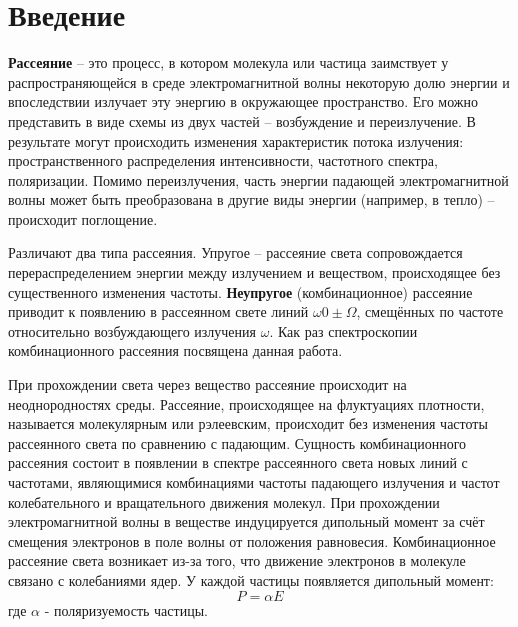 \documentclass{article}
\begin{document}
\section{Введение}\;
\par \textbf{Рассеяние} – это процесс, в котором молекула или частица заимствует у распространяющейся в среде электромагнитной волны некоторую долю энергии и впоследствии излучает эту энергию в окружающее пространство. Его можно представить в виде схемы из двух частей – возбуждение и переизлучение.
В результате могут происходить изменения характеристик потока излучения: пространственного распределения интенсивности, частотного спектра, поляризации. Помимо переизлучения, часть энергии падающей электромагнитной волны может быть преобразована в другие виды энергии (например, в тепло) – происходит поглощение.

Различают два типа рассеяния.
Упругое – рассеяние света сопровождается перераспределением энергии между излучением и веществом, происходящее без существенного изменения частоты. \textbf{Неупругое} (комбинационное) рассеяние приводит к появлению в рассеянном свете линий $\omega0 \pm \Omega$, смещённых по частоте относительно возбуждающего излучения $\omega$. Как раз спектроскопии комбинационного рассеяния посвящена данная работа.

При прохождении света через вещество рассеяние происходит на неоднородностях среды. Рассеяние, происходящее на флуктуациях плотности, называется молекулярным или рэлеевским, происходит без изменения частоты рассеянного света по сравнению с падающим. Сущность комбинационного рассеяния состоит в появлении в спектре рассеянного света новых линий с частотами, являющимися комбинациями частоты падающего излучения и частот колебательного и вращательного движения молекул. При прохождении электромагнитной волны в веществе индуцируется дипольный момент за счёт смещения электронов в поле волны от положения равновесия. Комбинационное рассеяние света возникает из-за того, что движение электронов в молекуле связано с колебаниями ядер. У каждой частицы появляется дипольный момент:
\[P = \alpha E\]
где $\alpha$ - поляризуемость частицы.
\end{document}
